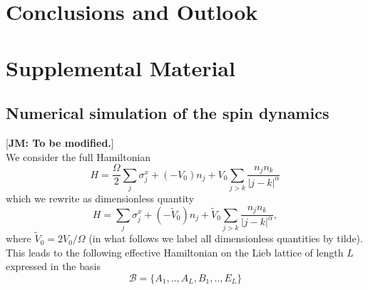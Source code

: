\documentclass[prl,aps,twocolumn,showpacs,superscriptaddress,longbibliography]{revtex4-1}
\begin{document}
\section{Conclusions and Outlook}



%
\section{Supplemental Material}


\subsection{Numerical simulation of the spin dynamics}

[{\bf JM: To be modified.}] \\

We consider the full Hamiltonian
\begin{equation}
	H = \frac{\Omega}{2} \sum_j \sigma^x_j + (-V_0) n_j + V_0 \sum_{j>k} \frac{n_j n_k}{|j-k|^\alpha}
\end{equation}
which we rewrite as dimensionless quantity
\begin{equation}
	H = \sum_j \sigma^x_j + (-\tilde{V}_0) n_j + \tilde{V}_0 \sum_{j>k} \frac{n_j n_k}{|j-k|^\alpha},
\end{equation}
where $\tilde{V}_0 = 2 V_0/\Omega$ (in what follows we label all dimensionless quantities by tilde). This leads to the following effective Hamiltonian on the Lieb lattice of length $L$ expressed in the basis
\begin{equation}
	\mathcal{B}=\{A_1,..,A_L,B_1,..,E_L\}
	\label{eq:basis}
\end{equation}
\end{document}
